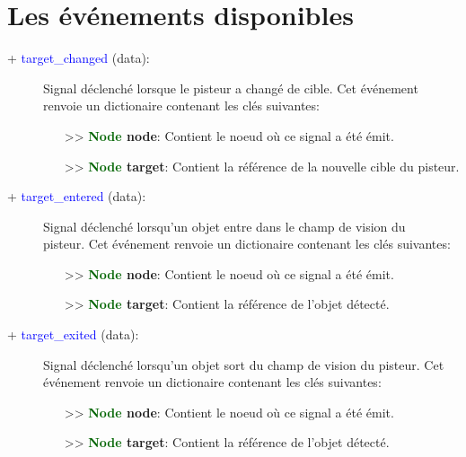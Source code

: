 \documentclass[a4paper, 11pt]{article}
\begin{document}
	\section{Les événements disponibles}
	\begin{description}
		\item [+ \textcolor{blue}{target\_changed} (data):] Signal déclenché lorsque le pisteur a changé de 
		cible. Cet événement renvoie un dictionaire contenant les clés suivantes:
		\begin{itemize}
			\item [>> \textbf{\textcolor{darkgreen}{Node} node}:] Contient le noeud où ce signal a été émit.
			\item [>> \textbf{\textcolor{darkgreen}{Node} target}:] Contient la référence de la nouvelle 
			cible du pisteur.\\
		\end{itemize}
	\end{description}
	\begin{description}
		\item [+ \textcolor{blue}{target\_entered} (data):] Signal déclenché lorsqu'un objet entre dans le 
		champ de vision du \\pisteur. Cet événement renvoie un dictionaire contenant les clés suivantes:
		\begin{itemize}
			\item [>> \textbf{\textcolor{darkgreen}{Node} node}:] Contient le noeud où ce signal a été émit.
			\item [>> \textbf{\textcolor{darkgreen}{Node} target}:] Contient la référence de l'objet 
			détecté.\\
		\end{itemize}
	\end{description}
	\begin{description}
		\item [+ \textcolor{blue}{target\_exited} (data):] Signal déclenché lorsqu'un objet sort du champ de 
		vision du pisteur. Cet événement renvoie un dictionaire contenant les clés suivantes:
		\begin{itemize}
			\item [>> \textbf{\textcolor{darkgreen}{Node} node}:] Contient le noeud où ce signal a été émit.
			\item [>> \textbf{\textcolor{darkgreen}{Node} target}:] Contient la référence de l'objet 
			détecté.\\
		\end{itemize}
	\end{description}
\end{document}
